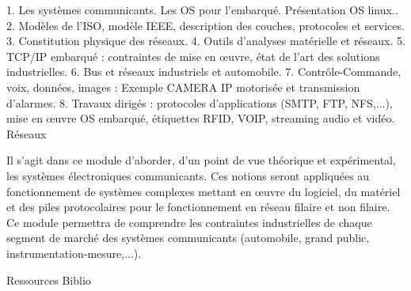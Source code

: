 {
1.	Les systèmes communicants. Les OS pour l'embarqué. Présentation OS linux..  
2.	Modèles de l'ISO, modèle IEEE, description des couches, protocoles et services. 
3.	Constitution physique des réseaux.
4.	Outils d'analyses matérielle et réseaux. 
5.	TCP/IP embarqué : contraintes de mise en \oe uvre, état de l'art des solutions industrielles.
6.	Bus et réseaux industriels et automobile.
7.	Contrôle-Commande, voix, données, images : Exemple CAMERA IP  motorisée  et transmission d'alarmes.
8.	Travaux dirigés : protocoles d'applications (SMTP, FTP, NFS,...), mise en \oe uvre OS embarqué, étiquettes RFID, VOIP, streaming audio et vidéo. 
} 
{Réseaux} 
{\begin{itemize}
\ObjItem Il s'agit dans ce module d'aborder, d'un point de vue théorique et expérimental, les systèmes électroniques communicants.
\ObjItem Ces notions seront appliquées au fonctionnement de systèmes complexes mettant en \oe uvre du logiciel, du matériel et des piles protocolaires pour le fonctionnement en réseau filaire et non filaire.
\ObjItem Ce module permettra de comprendre les contraintes industrielles de chaque segment de marché des systèmes communicants (automobile, grand public, instrumentation-mesure,...).
\end{itemize} 
} 
{Ressources} 
{Biblio} 
 
\vfill


